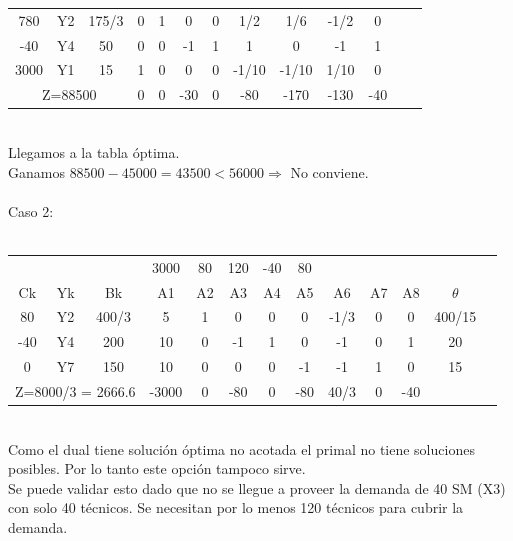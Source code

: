 \documentclass{article}
\begin{document}
\begin{enumerate}
\begin{tabular}{|c  c  c | c  c  c  c  c  c  c  c  c | c |}
			 780 & Y2 & 175/3 & 0 & 1 & 0 & 0 & 1/2 & 1/6 & -1/2 & 0 & \\
			 -40 & Y4 & 50 & 0 & 0 & -1 & 1 & 1 & 0 & -1 & 1 & \\
			 3000 & Y1 & 15 & 1 & 0 & 0 & 0 & -1/10 & -1/10 & 1/10 & 0 & \\ \hline
			 \multicolumn{3}{|c|}{Z=88500} & 0 & 0 & -30 & 0 & -80 & -170 & -130 & -40\\ \hline
		\end{tabular}
		\medskip\\
		Llegamos a la tabla \'optima.\\
		Ganamos $88500 - 45000 = 43500 < 56000 \Rightarrow $ No conviene.\\
		\smallskip\\
		Caso 2:\\
     	\smallskip\\
		\begin{tabular}{|c  c  c | c  c  c  c  c  c  c  c  c | c |}
			\hline
			 \multicolumn{3}{|c|}{} & 3000 & 80 & 120 & -40 & 80 & & & & \\ 
			 Ck & Yk & Bk & A1 & A2 & A3 & A4 & A5 & A6 & A7 & A8 & $\theta$\\ \hline 
			 80 & Y2 & 400/3 & 5 & 1 & 0 & 0 & 0 & -1/3 & 0 & 0 & 400/15\\
			 -40 & Y4 & 200 & 10 & 0 & -1 & 1 & 0 & -1 & 0 & 1 & 20\\
			 0 & Y7 & 150 & 10 & 0 & 0 & 0 & -1 & -1 & 1 & 0 & 15\\ \hline
			 \multicolumn{3}{|c|}{Z=8000/3 = 2666.6} & -3000 & 0 & -80 & 0 & -80 & 40/3 & 0 & -40 &\\ \hline
		\end{tabular}
		\medskip\\
	    Como el dual tiene soluci\'on \'optima no acotada el primal no tiene soluciones posibles. Por lo tanto este opci\'on tampoco sirve. 
     	\smallskip\\
	    Se puede validar esto dado que no se llegue a proveer la demanda de 40 SM (X3) con solo 40 t\'ecnicos. Se necesitan por lo menos 120 t\'ecnicos para cubrir la demanda.
		\medskip\\


\end{enumerate}
\end{document}
